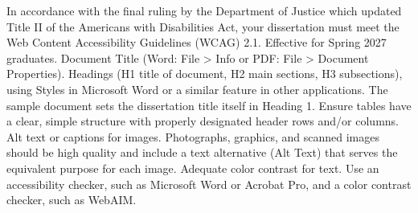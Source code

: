 	{In accordance with the final ruling by the Department of Justice which
	 updated Title II of the Americans with Disabilities Act, your dissertation
	 must meet the Web Content Accessibility Guidelines (WCAG) 2.1. Effective
	 for Spring 2027 graduates.}
	{Document Title (Word: File > Info or PDF: File > Document Properties).}
	{Headings (H1 title of document, H2 main sections, H3 subsections), using
	 Styles in Microsoft Word or a similar feature in other applications. The
	 sample document sets the dissertation title itself in Heading 1.}
	{Ensure tables have a clear, simple structure with properly designated
	 header rows and/or columns.}
	{Alt text or captions for images. Photographs, graphics, and scanned images
	 should be high quality and include a text alternative (Alt Text) that
	 serves the equivalent purpose for each image.}
	{Adequate color contrast for text. Use an accessibility checker, such as
	 Microsoft Word or Acrobat Pro, and a color contrast checker, such as
	 WebAIM.}

%
\newcommand{\thesis@uc@priordegrees}{}
\newcommand{\uconnpriordegrees}[1]{\renewcommand{\thesis@uc@priordegrees}{#1}}
\newcommand{\thesis@uc@postnominals}{}
\newcommand{\uconnpostnominals}[1]{\renewcommand{\thesis@uc@postnominals}{#1}}
\newcommand{\thesis@uc@year}{\the\year}
\newcommand{\uconnyear}[1]{\renewcommand{\thesis@uc@year}{#1}}

